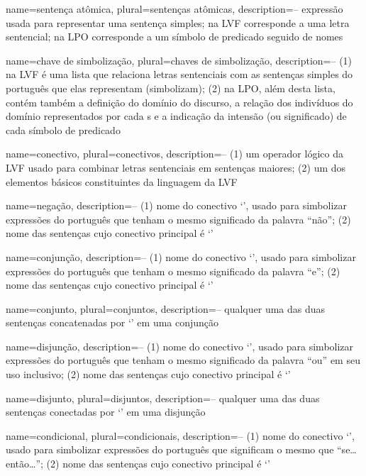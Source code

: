 {
 name=sentença atômica,
 plural=sentenças atômicas,
 description={-- expressão usada para representar uma sentença simples; na LVF corresponde a uma letra sentencial; na LPO corresponde a um símbolo de predicado seguido de nomes}
}

{
 name=chave de simbolização,
 plural=chaves de simbolização,
 description={-- (1) na LVF é uma lista que relaciona letras sentenciais com as sentenças simples do português que elas representam (simbolizam); (2) na LPO, além desta lista, contém também a definição do domínio do discurso, a relação dos indivíduos do domínio representados por cada s e a indicação da intensão (ou significado) de cada símbolo de predicado}
}

{
 name=conectivo,
 plural=conectivos,
description={-- (1) um operador lógico da LVF usado para combinar letras sentenciais em sentenças maiores; (2) um dos elementos básicos constituintes da linguagem da LVF}
}

{
 name=negação,
 description={-- (1) nome do conectivo `\enot', usado para simbolizar expressões do português que tenham o mesmo significado da palavra ``não''; (2) nome das sentenças cujo conectivo principal é `\enot'}
}

{
 name=conjunção,
 description={-- (1) nome do conectivo `\eand', usado para simbolizar expressões do português que tenham o mesmo significado da palavra ``e''; (2) nome das sentenças cujo conectivo principal é `\eand'}
}

{
 name=conjunto,
 plural=conjuntos,
 description={-- qualquer uma das duas sentenças concatenadas por `\eand' em uma conjunção}
}

{
 name=disjunção,
 description={-- (1) nome do conectivo `\eor', usado para simbolizar expressões do português que tenham o mesmo significado da palavra ``ou'' em seu uso inclusivo; (2) nome das sentenças cujo conectivo principal é `\eor'}
}

{
 name=disjunto,
 plural=disjuntos,
 description={-- qualquer uma das duas sentenças conectadas por `\eor' em uma disjunção}
}

{
 name=condicional,
 plural=condicionais,
 description={-- (1) nome do conectivo `\eif', usado para simbolizar expressões do português que significam o mesmo que ``se\ldots{}então\ldots''; (2) nome das sentenças cujo conectivo principal é `\eif'}
}

